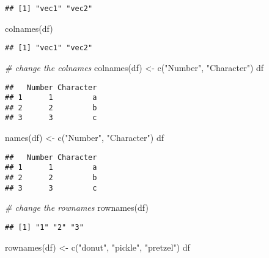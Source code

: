 \documentclass[
]{book}
\newenvironment{Shaded}{\begin{snugshade}}{\end{snugshade}}
\newcommand{\CommentTok}[1]{\textcolor[rgb]{0.56,0.35,0.01}{\textit{#1}}}
\newcommand{\FunctionTok}[1]{\textcolor[rgb]{0.00,0.00,0.00}{#1}}
\newcommand{\NormalTok}[1]{#1}
\newcommand{\OtherTok}[1]{\textcolor[rgb]{0.56,0.35,0.01}{#1}}
\newcommand{\StringTok}[1]{\textcolor[rgb]{0.31,0.60,0.02}{#1}}
\begin{document}
\begin{verbatim}
## [1] "vec1" "vec2"
\end{verbatim}

\begin{Shaded}
\begin{Highlighting}[]
\FunctionTok{colnames}\NormalTok{(df)}
\end{Highlighting}
\end{Shaded}

\begin{verbatim}
## [1] "vec1" "vec2"
\end{verbatim}

\begin{Shaded}
\begin{Highlighting}[]
\CommentTok{\# change the colnames}
\FunctionTok{colnames}\NormalTok{(df) }\OtherTok{\textless{}{-}} \FunctionTok{c}\NormalTok{(}\StringTok{"Number"}\NormalTok{, }\StringTok{"Character"}\NormalTok{)}
\NormalTok{df}
\end{Highlighting}
\end{Shaded}

\begin{verbatim}
##   Number Character
## 1      1         a
## 2      2         b
## 3      3         c
\end{verbatim}

\begin{Shaded}
\begin{Highlighting}[]
\FunctionTok{names}\NormalTok{(df) }\OtherTok{\textless{}{-}} \FunctionTok{c}\NormalTok{(}\StringTok{"Number"}\NormalTok{, }\StringTok{"Character"}\NormalTok{)}
\NormalTok{df}
\end{Highlighting}
\end{Shaded}

\begin{verbatim}
##   Number Character
## 1      1         a
## 2      2         b
## 3      3         c
\end{verbatim}

\begin{Shaded}
\begin{Highlighting}[]
\CommentTok{\# change the rownames}
\FunctionTok{rownames}\NormalTok{(df)}
\end{Highlighting}
\end{Shaded}

\begin{verbatim}
## [1] "1" "2" "3"
\end{verbatim}

\begin{Shaded}
\begin{Highlighting}[]
\FunctionTok{rownames}\NormalTok{(df) }\OtherTok{\textless{}{-}} \FunctionTok{c}\NormalTok{(}\StringTok{"donut"}\NormalTok{, }\StringTok{"pickle"}\NormalTok{, }\StringTok{"pretzel"}\NormalTok{)}
\NormalTok{df}
\end{Highlighting}
\end{Shaded}
\end{document}
